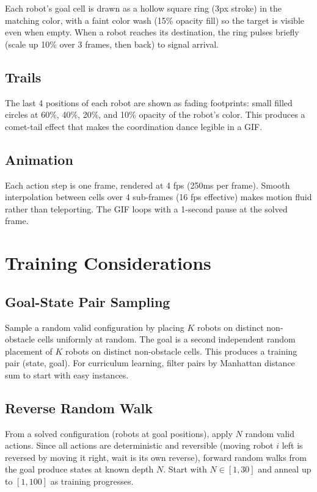 \documentclass[11pt]{article}
\begin{document}
Each robot's goal cell is drawn as a hollow square ring (3px stroke) in the matching color, with a faint color wash (15\% opacity fill) so the target is visible even when empty. When a robot reaches its destination, the ring pulses briefly (scale up 10\% over 3 frames, then back) to signal arrival.

\subsection{Trails}

The last 4 positions of each robot are shown as fading footprints: small filled circles at 60\%, 40\%, 20\%, and 10\% opacity of the robot's color. This produces a comet-tail effect that makes the coordination dance legible in a GIF.

\subsection{Animation}

Each action step is one frame, rendered at 4 fps (250ms per frame). Smooth interpolation between cells over 4 sub-frames (16 fps effective) makes motion fluid rather than teleporting. The GIF loops with a 1-second pause at the solved frame.

\section{Training Considerations}

\subsection{Goal-State Pair Sampling}

Sample a random valid configuration by placing $K$ robots on distinct non-obstacle cells uniformly at random. The goal is a second independent random placement of $K$ robots on distinct non-obstacle cells. This produces a training pair (state, goal). For curriculum learning, filter pairs by Manhattan distance sum to start with easy instances.

\subsection{Reverse Random Walk}

From a solved configuration (robots at goal positions), apply $N$ random valid actions. Since all actions are deterministic and reversible (moving robot $i$ left is reversed by moving it right, wait is its own reverse), forward random walks from the goal produce states at known depth $N$. Start with $N \in [1, 30]$ and anneal up to $[1, 100]$ as training progresses.
\end{document}
